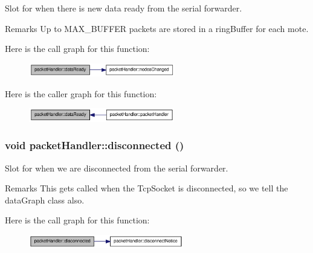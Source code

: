 Slot for when there is new data ready from the serial forwarder. 



\begin{DoxyRemark}{Remarks}
Up to MAX\_\-BUFFER packets are stored in a ringBuffer for each mote. 
\end{DoxyRemark}




Here is the call graph for this function:\nopagebreak
\begin{figure}[H]
\begin{center}
\leavevmode
\includegraphics[width=181pt]{classpacketHandler_a9085a61a51eccc7acb240a7b68601686_cgraph}
\end{center}
\end{figure}




Here is the caller graph for this function:\nopagebreak
\begin{figure}[H]
\begin{center}
\leavevmode
\includegraphics[width=180pt]{classpacketHandler_a9085a61a51eccc7acb240a7b68601686_icgraph}
\end{center}
\end{figure}


\hypertarget{classpacketHandler_a43223a8930a6af8c40c5889d8e4b9d4b}{
\subsubsection[{disconnected}]{\setlength{\rightskip}{0pt plus 5cm}void packetHandler::disconnected ()}}
\label{classpacketHandler_a43223a8930a6af8c40c5889d8e4b9d4b}


Slot for when we are disconnected from the serial forwarder. 

\begin{DoxyRemark}{Remarks}
This gets called when the TcpSocket is disconnected, so we tell the dataGraph class also. 
\end{DoxyRemark}


Here is the call graph for this function:\nopagebreak
\begin{figure}[H]
\begin{center}
\leavevmode
\includegraphics[width=191pt]{classpacketHandler_a43223a8930a6af8c40c5889d8e4b9d4b_cgraph}
\end{center}
\end{figure}




